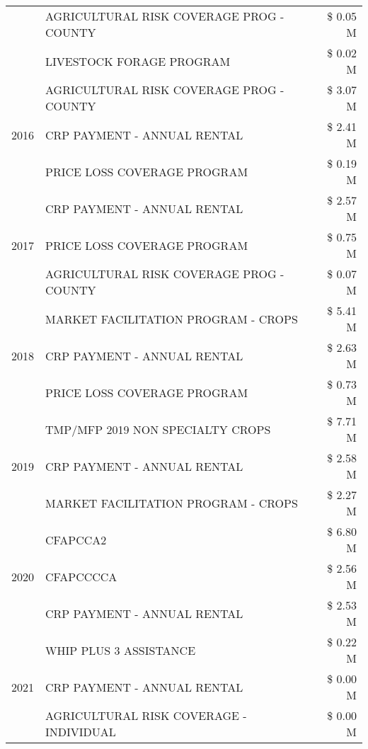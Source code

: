 \begin{tabular}{llr}
 & AGRICULTURAL RISK COVERAGE PROG - COUNTY & \$ 0.05 M \\
 & LIVESTOCK FORAGE PROGRAM & \$ 0.02 M \\
\cline{1-3}
\multirow[t]{3}{*}{2016} & AGRICULTURAL RISK COVERAGE PROG - COUNTY & \$ 3.07 M \\
 & CRP PAYMENT - ANNUAL RENTAL & \$ 2.41 M \\
 & PRICE LOSS COVERAGE PROGRAM & \$ 0.19 M \\
\cline{1-3}
\multirow[t]{3}{*}{2017} & CRP PAYMENT - ANNUAL RENTAL & \$ 2.57 M \\
 & PRICE LOSS COVERAGE PROGRAM & \$ 0.75 M \\
 & AGRICULTURAL RISK COVERAGE PROG - COUNTY & \$ 0.07 M \\
\cline{1-3}
\multirow[t]{3}{*}{2018} & MARKET FACILITATION PROGRAM - CROPS & \$ 5.41 M \\
 & CRP PAYMENT - ANNUAL RENTAL & \$ 2.63 M \\
 & PRICE LOSS COVERAGE PROGRAM & \$ 0.73 M \\
\cline{1-3}
\multirow[t]{3}{*}{2019} & TMP/MFP 2019 NON SPECIALTY CROPS & \$ 7.71 M \\
 & CRP PAYMENT - ANNUAL RENTAL & \$ 2.58 M \\
 & MARKET FACILITATION PROGRAM - CROPS & \$ 2.27 M \\
\cline{1-3}
\multirow[t]{3}{*}{2020} & CFAPCCA2 & \$ 6.80 M \\
 & CFAPCCCCA & \$ 2.56 M \\
 & CRP PAYMENT - ANNUAL RENTAL & \$ 2.53 M \\
\cline{1-3}
\multirow[t]{3}{*}{2021} & WHIP PLUS 3 ASSISTANCE & \$ 0.22 M \\
 & CRP PAYMENT - ANNUAL RENTAL & \$ 0.00 M \\
 & AGRICULTURAL RISK COVERAGE - INDIVIDUAL & \$ 0.00 M \\
\cline{1-3}
\bottomrule
\end{tabular}
